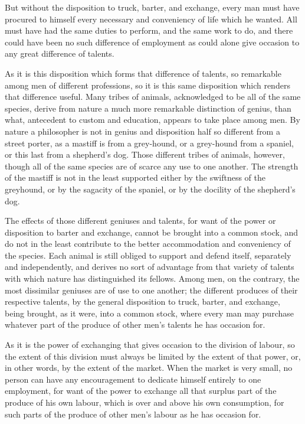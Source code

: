 But without the disposition to truck, barter, and exchange, every man must have procured to himself every necessary and conveniency of life which he wanted. All must have had the same duties to perform, and the same work to do, and there could have been no such difference of employment as could alone give occasion to any great difference of talents.\par

As it is this disposition which forms that difference of talents, so remarkable among men of different professions, so it is this same disposition which renders that difference useful. Many tribes of animals, acknowledged to be all of the same species, derive from nature a much more remarkable distinction of genius, than what, antecedent to custom and education, appears to take place among men. By nature a philosopher is not in genius and disposition half so different from a street porter, as a mastiff is from a grey-hound, or a grey-hound from a spaniel, or this last from a shepherd’s dog. Those different tribes of animals, however, though all of the same species are of scarce any use to one another. The strength of the mastiff is not in the least supported either by the swiftness of the greyhound, or by the sagacity of the spaniel, or by the docility of the shepherd’s dog.\par

The effects of those different geniuses and talents, for want of the power or disposition to barter and exchange, cannot be brought into a common stock, and do not in the least contribute to the better accommodation and conveniency of the species. Each animal is still obliged to support and defend itself, separately and independently, and derives no sort of advantage from that variety of talents with which nature has distinguished its fellows. Among men, on the contrary, the most dissimilar geniuses are of use to one another; the different produces of their respective talents, by the general disposition to truck, barter, and exchange, being brought, as it were, into a common stock, where every man may purchase whatever part of the produce of other men’s talents he has occasion for.\par


As it is the power of exchanging that gives occasion to the division of labour, so the extent of this division must always be limited by the extent of that power, or, in other words, by the extent of the market. When the market is very small, no person can have any encouragement to dedicate himself entirely to one employment, for want of the power to exchange all that surplus part of the produce of his own labour, which is over and above his own consumption, for such parts of the produce of other men’s labour as he has occasion for.\par

